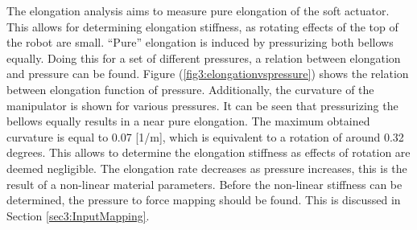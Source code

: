 The elongation analysis aims to measure pure elongation of the soft actuator. This allows for determining elongation stiffness, as rotating effects of the top of the robot are small. ``Pure'' elongation is induced by pressurizing both bellows equally. Doing this for a set of different pressures, a relation between elongation and pressure can be found. Figure (\ref{fig3:elongationvspressure}) shows the relation between elongation function of pressure. Additionally, the curvature of the manipulator is shown for various pressures. It can be seen that pressurizing the bellows equally results in a near pure elongation. The maximum obtained curvature is equal to 0.07 [1/m], which is equivalent to a rotation of around 0.32 degrees. This allows to determine the elongation stiffness as effects of rotation are deemed negligible. The elongation rate decreases as pressure increases, this is the result of a non-linear material parameters. Before the non-linear stiffness can be determined, the pressure to force mapping should be found. This is discussed in Section \ref{sec3:InputMapping}.

